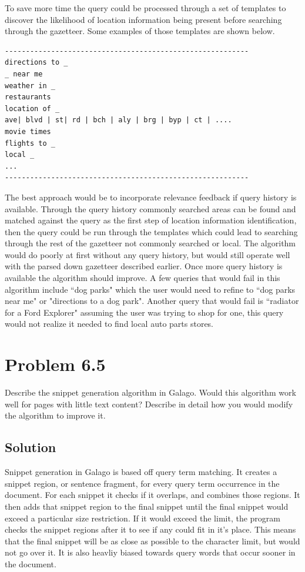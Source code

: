 \documentclass[letterpaper,12pt]{article}
\begin{document}
To save more time the query could be processed through a set of templates to discover the likelihood of location information being present before searching through the gazetteer. Some examples of those templates are shown below.

 \begin{lstlisting}[breaklines]
----------------------------------------------------------
directions to _
_ near me
weather in _
restaurants
location of _
ave| blvd | st| rd | bch | aly | brg | byp | ct | ....
movie times
flights to _
local _
...
----------------------------------------------------------
\end{lstlisting}

The best approach would be to incorporate relevance feedback if query history is available. Through the query history commonly searched areas can be found and matched against the query as the first step of location information identification, then the query could be run through the templates which could lead to searching through the rest of the gazetteer not commonly searched or local. The algorithm would do poorly at first without any query history, but would still operate well with the parsed down gazetteer described earlier. Once more query history is available the algorithm should improve. A few queries that would fail in this algorithm include ``dog parks" which the user would need to refine to ``dog parks near me" or "directions to a dog park". Another query that would fail is ``radiator for a Ford Explorer" assuming the user was trying to shop for one, this query would not realize it needed to find local auto parts stores.

\pagebreak

\section{Problem 6.5}

Describe the snippet generation algorithm in Galago. Would this algorithm work well for pages with little text content? Describe in detail how you would modify the algorithm to improve it.

\subsection{Solution}


Snippet generation in Galago is based off query term matching. It creates a snippet region, or sentence fragment, for every query term occurrence in the document. For each snippet it checks if it overlaps, and combines those regions. It then adds that snippet region to the final snippet until the final snippet would exceed a particular size restriction. If it would exceed the limit, the program checks the snippet regions after it to see if any could fit in it's place. This means that the final snippet will be as close as possible to the character limit, but would not go over it. It is also heavliy biased towards query words that occur sooner in the document.
\end{document}

